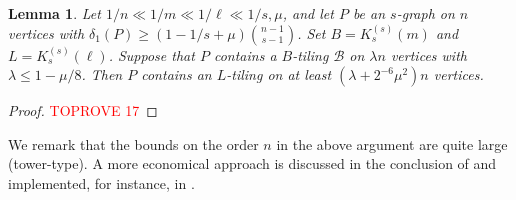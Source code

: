 \documentclass[12pt,reqno]{amsart}
\theoremstyle{plain}
\newtheorem{lemma}[theorem]{Lemma}
\theoremstyle{definition}
\numberwithin{equation}{section}
\renewcommand{\geq}{\geqslant}
\renewcommand{\leq}{\leqslant}
\newcommand{\cB}{\mathcal{B}}
\begin{document}
	\begin{lemma}\label{lem:larger-matching}
		Let	$1/n \ll 1/m \ll  1/\ell \ll 1/s, \mu$, and let $P$ be an $s$-graph on $n$ vertices with $\delta_1(P) \geq \left(1-1/s+ \mu \right) \binom{n-1}{s-1}$.
		Set $B = K_{s}^{(s)}(m)$ and $L= K_{s}^{(s)}(\ell)$.
		Suppose that $P$ contains a $B$-tiling $\cB$ on $\lambda n$ vertices with $\lambda \leq 1-\mu/8$.
		Then $P$ contains an $L$-tiling on at least $(\lambda + 2^{-6}\mu^2 ) n$ vertices.
	\end{lemma}
	
	\begin{proof}\textcolor{red}{TOPROVE 17}\end{proof}
	
	We remark that the bounds on the order $n$ in the above argument are quite large (tower-type).
	A more economical approach is discussed in the conclusion of \cite{lang2023tiling} and implemented, for instance, in \cite[Lemma~B.3]{langsanhueza2024dirac}.
	
	
	
	
	
\end{document}
